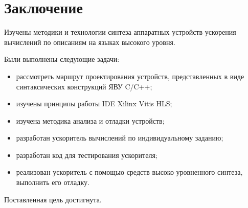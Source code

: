 \chapter*{Заключение}
Изучены методики и технологии синтеза аппаратных устройств ускорения вычислений по описаниям на языках высокого уровня. 

Были выполнены следующие задачи:
\begin{itemize}
	\item рассмотреть маршрут проектирования устройств, представленных в виде синтаксических конструкций ЯВУ C/C++;
	\item изучены принципы работы IDE Xilinx Vitis HLS;
	\item изучена методика анализа и отладки устройств;
	\item разработан ускоритель вычислений по индивидуальному заданию;
	\item разработан код для тестирования ускорителя;
	\item реализован ускоритель с помощью средств высоко-уровненного синтеза, выполнить его отладку.
\end{itemize}

Поставленная цель достигнута.